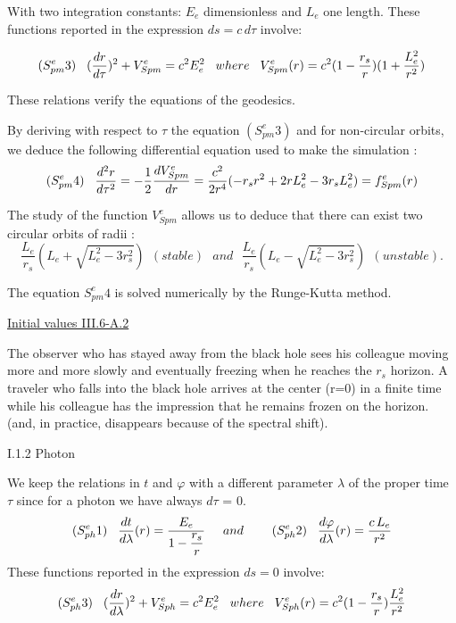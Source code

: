 \documentclass [12pt]{article}
\def\ph#1{\hskip #1}
\def\pv#1{\vskip #1}
\begin{document}
       
        With two integration constants: $E_e$ dimensionless and $L_e$ one length. These functions reported in the expression $ds=c\,d\tau$ involve:

      		$$(S^e_{pm}3)\ph 3mm \displaystyle(\frac{dr}{d\tau})^2+ V^e_{Spm}=c^2E_e^2 \ph 3mm  where \ph 3mm V^e_{Spm}(r)= c^2(1 -\frac{r_s}{r}) (1+\frac{L_e^2}{r^2}) $$

        These relations verify the equations of the geodesics. 

		 By deriving with respect to $\tau$ the equation $(S^e_{pm}3)$ and for non-circular orbits, we deduce the following differential equation used to make the simulation :
			$$(S^e_{pm}4)\ph 3mm  \frac{d^2r}{d\tau^2}= -\frac{1}{2} \frac{dV^e_{Spm}}{dr}=\frac{c^2}{2r^4}(-r_sr^2+2rL_e^2-3r_sL_e^2)=f^e_{Spm}(r) $$ 


		The study of the function $V^e_{Spm}$ allows us to deduce that there can exist two circular orbits of radii :
		$$\displaystyle\frac{L_e}{r_s}\left(L_e+\sqrt{L_e^2-3r_s^2}\right)~~(stable)~~~ and~~~ \displaystyle\frac{L_e}{r_s}\left(L_e-\sqrt{L_e^2-3r_s^2}\right)~~ (unstable).$$

		The equation $S^e_{pm}4$ is solved numerically by the Runge-Kutta method.
		
		\hyperlink{A2massif} {Initial values III.6-A.2}
		       
			 The observer who has stayed away from the black hole sees his colleague moving more and more slowly and eventually freezing when he reaches the $r_s$ horizon.
			 A traveler who falls into the black hole arrives at the center (r=0) in a finite time while his colleague has the impression that he remains frozen on the horizon.
			 (and, in practice, disappears because of the spectral shift). 
             
\pv 1.5mm

{ I.1.2 Photon}
          
    \pv 1.5mm          
         We keep the relations in $t$ and  $\varphi$  with a different parameter $\lambda$ of the proper time $\tau$ since for a
photon we have always $d\tau$ = 0.
\pv -2mm
		$$(S^e_{ph}1)\ph 3mm \displaystyle{dt\over d\lambda}(r)={ E_e\over \displaystyle {1- {r_s \over r}}}\ph 5mm  and \ph 5mm \ph 3mm (S^e_{ph}2)\ph 3mm {d\varphi\over d\lambda}(r) = {c\,L_e\over r^2}$$
		These functions reported in the expression $ds=0$ involve:
\pv -2mm
      		$$(S^e_{ph}3)\ph 3mm \displaystyle(\frac{dr}{d\lambda})^2+ V^e_{Sph}=c^2E_e^2 \ph 3mm  where \ph 3mm V^e_{Sph}(r)= c^2(1 -\frac{r_s}{r})\frac{L_e^2}{r^2} $$
\end{document}
